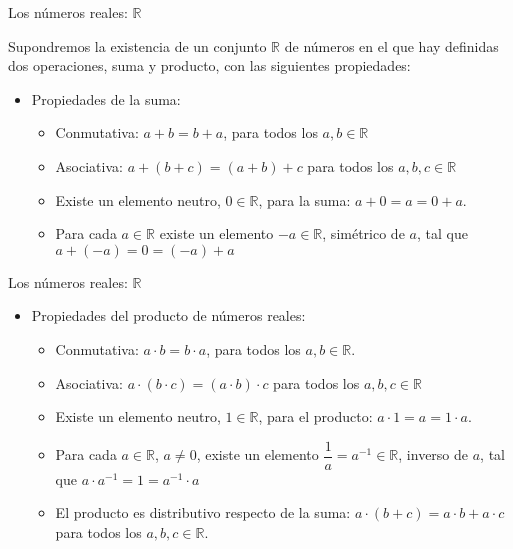 \documentclass[ignorenonframetext,]{beamer}
\providecommand{\tightlist}{%
  \setlength{\itemsep}{0pt}\setlength{\parskip}{0pt}}
\begin{document}
\begin{frame}{Los números reales: \(\mathbb{R}\)}
\protect\hypertarget{los-nuxfameros-reales-mathbbr}{}

Supondremos la existencia de un conjunto \(\mathbb{R}\) de números en el
que hay definidas dos operaciones, suma y producto, con las siguientes
propiedades:

\begin{itemize}
\tightlist
\item
  Propiedades de la suma:

  \begin{itemize}
  \item
    Conmutativa: \(a+b= b+a\), para todos los \(a,b \in \mathbb{R}\)
  \item
    Asociativa: \(a+(b+c) = (a+b)+c\) para todos los
    \(a,b,c \in \mathbb{R}\)
  \item
    Existe un elemento neutro, \(0 \in \mathbb{R}\), para la suma:
    \(a+0=a=0+a\).
  \item
    Para cada \(a \in \mathbb{R}\) existe un elemento
    \(-a \in \mathbb{R}\), simétrico de \(a\), tal que
    \(a+(-a)=0=(-a)+a\)
  \end{itemize}
\end{itemize}

\end{frame}

\begin{frame}{Los números reales: \(\mathbb{R}\)}
\protect\hypertarget{los-nuxfameros-reales-mathbbr-1}{}

\begin{itemize}
\item
  Propiedades del producto de números reales:

  \begin{itemize}
  \item
    Conmutativa: \(a\cdot b=b \cdot a\), para todos los
    \(a,b \in \mathbb{R}\).
  \item
    Asociativa: \(a \cdot (b \cdot c) = (a\cdot b)\cdot c\) para todos
    los \(a,b,c \in \mathbb{R}\)
  \item
    Existe un elemento neutro, \(1 \in \mathbb{R}\), para el producto:
    \(a\cdot1=a=1\cdot a\).
  \item
    Para cada \(a \in \mathbb{R}\), \(a\neq 0\), existe un elemento
    \(\dfrac{1}{a} = a^{-1} \in \mathbb{R}\), inverso de \(a\), tal que
    \(a \cdot a^{-1}=1=a ^{-1}\cdot a\)
  \item
    El producto es distributivo respecto de la suma:
    \(a\cdot (b+c) = a\cdot b + a \cdot c\) para todos los
    \(a,b,c \in \mathbb{R}\).
  \end{itemize}
\end{itemize}

\end{frame}
\end{document}
